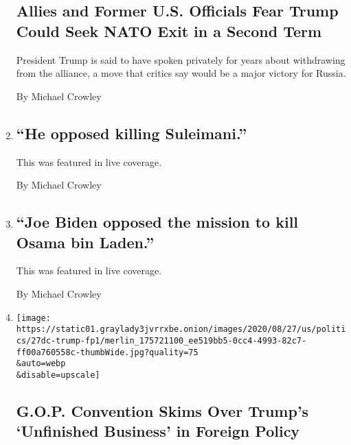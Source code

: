 \begin{enumerate}
  \hypertarget{allies-and-former-us-officials-fear-trump-could-seek-nato-exit-in-a-second-term}{%
  \subsection{Allies and Former U.S. Officials Fear Trump Could Seek
  NATO Exit in a Second
  Term}\label{allies-and-former-us-officials-fear-trump-could-seek-nato-exit-in-a-second-term}}

  President Trump is said to have spoken privately for years about
  withdrawing from the alliance, a move that critics say would be a
  major victory for Russia.

  By Michael Crowley
\item
  \href{/live/2020/08/27/us/rnc-fact-check/he-opposed-killing-suleimani}{}

  \hypertarget{he-opposed-killing-suleimani}{%
  \subsection{``He opposed killing
  Suleimani.''}\label{he-opposed-killing-suleimani}}

  This was featured in live coverage.

  By Michael Crowley
\item
  \href{/live/2020/08/27/us/rnc-fact-check/joe-biden-opposed-the-mission-to-kill-osama-bin-laden}{}

  \hypertarget{joe-biden-opposed-the-mission-to-kill-osama-bin-laden}{%
  \subsection{``Joe Biden opposed the mission to kill Osama bin
  Laden.''}\label{joe-biden-opposed-the-mission-to-kill-osama-bin-laden}}

  This was featured in live coverage.

  By Michael Crowley
\item
  \href{/2020/08/27/us/politics/trump-foreign-policy.html}{}

  \texttt{[image: https://static01.graylady3jvrrxbe.onion/images/2020/08/27/us/politics/27dc-trump-fp1/merlin\_175721100\_ee519bb5-0cc4-4993-82c7-ff00a760558c-thumbWide.jpg?quality=75\\\&auto=webp\\\&disable=upscale]}

  \hypertarget{gop-convention-skims-over-trumps-unfinished-business-in-foreign-policy}{%
  \subsection{G.O.P. Convention Skims Over Trump's `Unfinished Business'
  in Foreign
  Policy}\label{gop-convention-skims-over-trumps-unfinished-business-in-foreign-policy}}


\end{enumerate}
